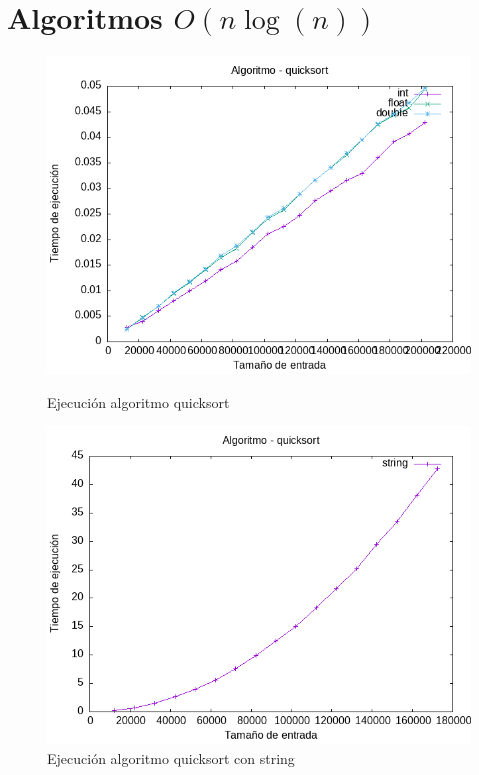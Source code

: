 \documentclass[11pt,openany]{book}
\begin{document}
    \section{Algoritmos  \(O(n\log(n))\)}
    \begin{figure}[H]
        \begin{minipage}{0.5\textwidth}
            \centering
            \includegraphics[width=\linewidth]{assets/Img/quicksort.png}
            \caption{Ejecución algoritmo quicksort}
            \label{fig:quicksort}
        \end{minipage}%
        \begin{minipage}{0.5\textwidth}
            \centering
            \includegraphics[width=\linewidth]{assets/Img/quicksortstring.png}
            \caption{Ejecución algoritmo quicksort con string}
            \label{fig:quicksortstring}
        \end{minipage}
    \end{figure}
\end{document}
